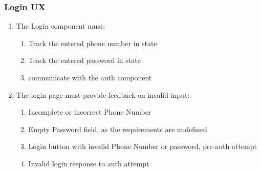 \documentclass[12pt]{article}
\begin{document}
\subsubsection{Login UX}
\begin{enumerate}	
	\item The Login component must:
	\begin{enumerate}
		\singlespacing
		\item Track the entered phone number in state
		\item Track the entered password in state
		\item communicate with the auth component
	\end{enumerate}
	\item The login page must provide feedback on invalid input:
	\begin{enumerate}
		\singlespacing
		\item Incomplete or incorrect Phone Number
		\item Empty Password field, as the requirements are undefined
		\item Login button with invalid Phone Number or password, pre-auth attempt
		\item Invalid login response to auth attempt
	\end{enumerate}
\end{enumerate}	
\end{document}
